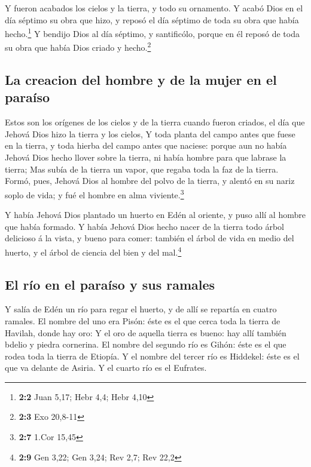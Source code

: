  Y fueron acabados los cielos y la tierra, y todo su
ornamento.  Y acabó Dios en el día séptimo su obra que hizo,
y reposó el día séptimo de toda su obra que había hecho.\footnote{\textbf{2:2}
  Juan 5,17; Hebr 4,4; Hebr 4,10}  Y bendijo Dios al día
séptimo, y santificólo, porque en él reposó de toda su obra que había
Dios criado y hecho.\footnote{\textbf{2:3} Exo 20,8-11}

\hypertarget{la-creacion-del-hombre-y-de-la-mujer-en-el-parauxedso}{%
\subsection{La creacion del hombre y de la mujer en el
paraíso}\label{la-creacion-del-hombre-y-de-la-mujer-en-el-parauxedso}}

 Estos son los orígenes de los cielos y de la tierra cuando
fueron criados, el día que Jehová Dios hizo la tierra y los cielos,
 Y toda planta del campo antes que fuese en la tierra, y
toda hierba del campo antes que naciese: porque aun no había Jehová Dios
hecho llover sobre la tierra, ni había hombre para que labrase la
tierra;  Mas subía de la tierra un vapor, que regaba toda la
faz de la tierra.  Formó, pues, Jehová Dios al hombre del
polvo de la tierra, y alentó en su nariz soplo de vida; y fué el hombre
en alma viviente.\footnote{\textbf{2:7} 1.Cor 15,45}

 Y había Jehová Dios plantado un huerto en Edén al oriente,
y puso allí al hombre que había formado.  Y había Jehová
Dios hecho nacer de la tierra todo árbol delicioso á la vista, y bueno
para comer: también el árbol de vida en medio del huerto, y el árbol de
ciencia del bien y del mal.\footnote{\textbf{2:9} Gen 3,22; Gen 3,24;
  Rev 2,7; Rev 22,2}

\hypertarget{el-ruxedo-en-el-parauxedso-y-sus-ramales}{%
\subsection{El río en el paraíso y sus
ramales}\label{el-ruxedo-en-el-parauxedso-y-sus-ramales}}

 Y salía de Edén un río para regar el huerto, y de allí se
repartía en cuatro ramales.  El nombre del uno era Pisón:
éste es el que cerca toda la tierra de Havilah, donde hay oro:
 Y el oro de aquella tierra es bueno: hay allí también
bdelio y piedra cornerina.  El nombre del segundo río es
Gihón: éste es el que rodea toda la tierra de Etiopía.  Y
el nombre del tercer río es Hiddekel: éste es el que va delante de
Asiria. Y el cuarto río es el Eufrates.

